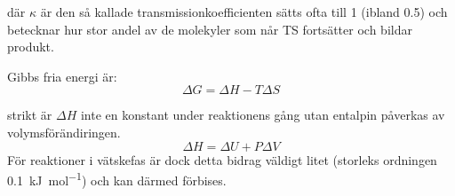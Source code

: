 där $\kappa$ är den så kallade transmissionkoefficienten sätts ofta till
1 (ibland 0.5) och betecknar hur stor andel av de molekyler som når TS
fortsätter och bildar produkt.

Gibbs fria energi är:
\begin{equation}
  \label{eq:gibbs}
  \Delta G = \Delta H - T\Delta S
\end{equation}

strikt är $\Delta H$ inte en konstant under reaktionens gång utan
entalpin påverkas av volymsförändiringen.
\begin{equation}
  \label{eq:enthalpy}
  \Delta H = \Delta U + P\Delta V
\end{equation}
För reaktioner i vätskefas är dock detta bidrag väldigt litet (storleks
ordningen \SI{0.1}{\kilo\joule\per\mole}) och kan därmed förbises.


